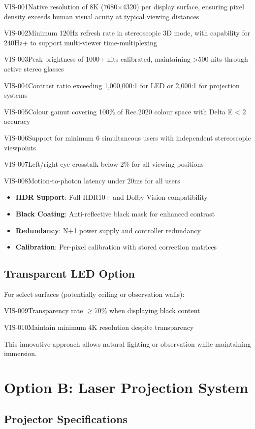 \begin{requirement}{VIS-001}{Native resolution of 8K (7680×4320) per display surface, ensuring pixel density exceeds human visual acuity at typical viewing distances}
\begin{requirement}{VIS-002}{Minimum 120Hz refresh rate in stereoscopic 3D mode, with capability for 240Hz+ to support multi-viewer time-multiplexing}
\begin{requirement}{VIS-003}{Peak brightness of 1000+ nits calibrated, maintaining >500 nits through active stereo glasses}
\begin{requirement}{VIS-004}{Contrast ratio exceeding 1,000,000:1 for LED or 2,000:1 for projection systems}
\begin{requirement}{VIS-005}{Colour gamut covering 100\% of Rec.2020 colour space with Delta E < 2 accuracy}
\begin{requirement}{VIS-006}{Support for minimum 6 simultaneous users with independent stereoscopic viewpoints}
\begin{requirement}{VIS-007}{Left/right eye crosstalk below 2\% for all viewing positions}
\begin{requirement}{VIS-008}{Motion-to-photon latency under 20ms for all users}
\begin{itemize}
    \item \textbf{HDR Support}: Full HDR10+ and Dolby Vision compatibility
    \item \textbf{Black Coating}: Anti-reflective black mask for enhanced contrast
    \item \textbf{Redundancy}: N+1 power supply and controller redundancy
    \item \textbf{Calibration}: Per-pixel calibration with stored correction matrices
\end{itemize}

\subsection{Transparent LED Option}

For select surfaces (potentially ceiling or observation walls):

\begin{requirement}{VIS-009}{Transparency rate $\ge$70\% when displaying black content}

\begin{requirement}{VIS-010}{Maintain minimum 4K resolution despite transparency}

This innovative approach allows natural lighting or observation while maintaining immersion.

\section{Option B: Laser Projection System}

\subsection{Projector Specifications}


\end{requirement}
\end{requirement}
\end{requirement}
\end{requirement}
\end{requirement}
\end{requirement}
\end{requirement}
\end{requirement}
\end{requirement}
\end{requirement}
